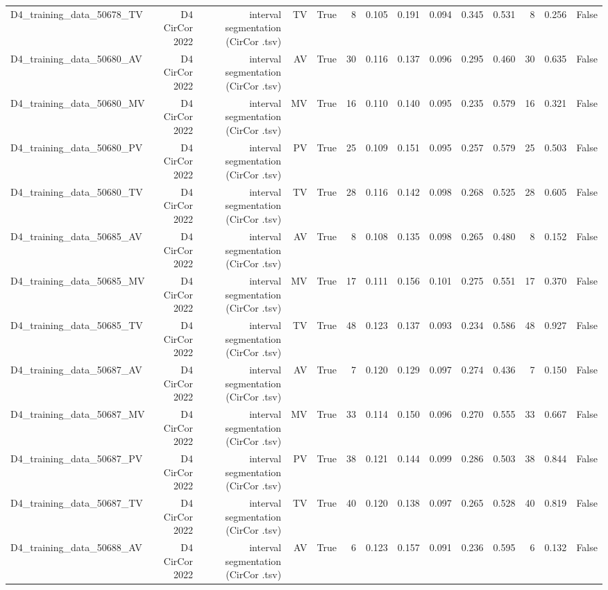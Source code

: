 \begin{table}[htbp]
\begin{tabular}{lrrrrrrrrrrrrr}
    D4\_training\_data\_50678\_TV & D4 CirCor 2022 & interval segmentation (CirCor .tsv) & TV & True & 8 & 0.105 & 0.191 & 0.094 & 0.345 & 0.531 & 8 & 0.256 & False \\
    D4\_training\_data\_50680\_AV & D4 CirCor 2022 & interval segmentation (CirCor .tsv) & AV & True & 30 & 0.116 & 0.137 & 0.096 & 0.295 & 0.460 & 30 & 0.635 & False \\
    D4\_training\_data\_50680\_MV & D4 CirCor 2022 & interval segmentation (CirCor .tsv) & MV & True & 16 & 0.110 & 0.140 & 0.095 & 0.235 & 0.579 & 16 & 0.321 & False \\
    D4\_training\_data\_50680\_PV & D4 CirCor 2022 & interval segmentation (CirCor .tsv) & PV & True & 25 & 0.109 & 0.151 & 0.095 & 0.257 & 0.579 & 25 & 0.503 & False \\
    D4\_training\_data\_50680\_TV & D4 CirCor 2022 & interval segmentation (CirCor .tsv) & TV & True & 28 & 0.116 & 0.142 & 0.098 & 0.268 & 0.525 & 28 & 0.605 & False \\
    D4\_training\_data\_50685\_AV & D4 CirCor 2022 & interval segmentation (CirCor .tsv) & AV & True & 8 & 0.108 & 0.135 & 0.098 & 0.265 & 0.480 & 8 & 0.152 & False \\
    D4\_training\_data\_50685\_MV & D4 CirCor 2022 & interval segmentation (CirCor .tsv) & MV & True & 17 & 0.111 & 0.156 & 0.101 & 0.275 & 0.551 & 17 & 0.370 & False \\
    D4\_training\_data\_50685\_TV & D4 CirCor 2022 & interval segmentation (CirCor .tsv) & TV & True & 48 & 0.123 & 0.137 & 0.093 & 0.234 & 0.586 & 48 & 0.927 & False \\
    D4\_training\_data\_50687\_AV & D4 CirCor 2022 & interval segmentation (CirCor .tsv) & AV & True & 7 & 0.120 & 0.129 & 0.097 & 0.274 & 0.436 & 7 & 0.150 & False \\
    D4\_training\_data\_50687\_MV & D4 CirCor 2022 & interval segmentation (CirCor .tsv) & MV & True & 33 & 0.114 & 0.150 & 0.096 & 0.270 & 0.555 & 33 & 0.667 & False \\
    D4\_training\_data\_50687\_PV & D4 CirCor 2022 & interval segmentation (CirCor .tsv) & PV & True & 38 & 0.121 & 0.144 & 0.099 & 0.286 & 0.503 & 38 & 0.844 & False \\
    D4\_training\_data\_50687\_TV & D4 CirCor 2022 & interval segmentation (CirCor .tsv) & TV & True & 40 & 0.120 & 0.138 & 0.097 & 0.265 & 0.528 & 40 & 0.819 & False \\
    D4\_training\_data\_50688\_AV & D4 CirCor 2022 & interval segmentation (CirCor .tsv) & AV & True & 6 & 0.123 & 0.157 & 0.091 & 0.236 & 0.595 & 6 & 0.132 & False \\

\end{tabular}
\end{table}
